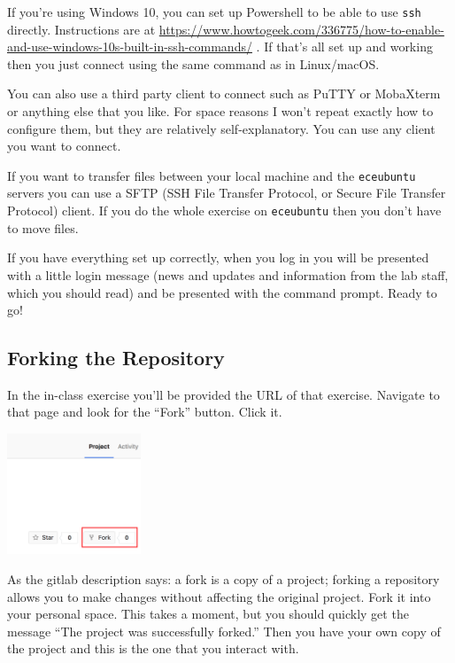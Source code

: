 If you're using Windows 10, you can set up Powershell to be able to use \texttt{ssh} directly. Instructions are at \url{https://www.howtogeek.com/336775/how-to-enable-and-use-windows-10s-built-in-ssh-commands/} . If that's all set up and working then you just connect using the same command as in Linux/macOS.

You can also use a third party client to connect such as PuTTY or MobaXterm or anything else that you like. For space reasons I won't repeat exactly how to configure them, but they are relatively self-explanatory. You can use any client you want to connect.

If you want to transfer files between your local machine and the \texttt{eceubuntu} servers you can use a SFTP (SSH File Transfer Protocol, or Secure File Transfer Protocol) client. If you do the whole exercise on \texttt{eceubuntu} then you don't have to move files.

If you have everything set up correctly, when you log in you will be presented with a little login message (news and updates and information from the lab staff, which you should read) and be presented with the command prompt. Ready to go!

\subsection*{Forking the Repository}
In the in-class exercise you'll be provided the URL of that exercise. Navigate to that page and look for the ``Fork'' button. Click it.

\begin{center}
	\includegraphics[width=0.3\textwidth]{images/gitlab-fork.png}
\end{center}

As the gitlab description says: a fork is a copy of a project; forking a repository allows you to make changes without affecting the original project. Fork it into your personal space. This takes a moment, but you should quickly get the message ``The project was successfully forked.'' Then you have your own copy of the project and this is the one that you interact with.

